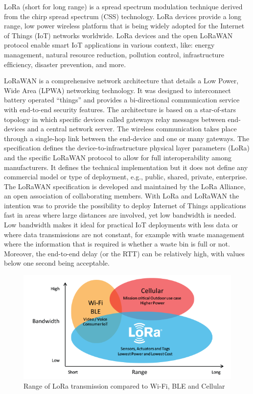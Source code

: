 			LoRa (short for long range) is a spread spectrum modulation
			technique derived from the chirp spread spectrum (CSS)
			technology. LoRa devices provide a long range, low power
			wireless platform that is being widely adopted for the Internet
			of Things (IoT) networks worldwide. LoRa devices and the
			open LoRaWAN protocol enable smart IoT applications in
			various context, like: energy management, natural resource
			reduction, pollution control, infrastructure efﬁciency, disaster
			prevention, and more.

			LoRaWAN is a comprehensive network architecture that details a Low Power, Wide Area (LPWA) networking technology.
			It was designed to interconnect battery operated “things” and
			provides a bi-directional communication service with end-to-end security features. The architecture is based on a star-of-stars topology in which speciﬁc devices called gateways relay
			messages between end-devices and a central network server.
			The wireless communication takes place through a single-hop
			link between the end-device and one or many gateways.
			The speciﬁcation deﬁnes the device-to-infrastructure physical layer parameters (LoRa) and the speciﬁc LoRaWAN protocol to allow for full interoperability among manufacturers. It
			deﬁnes the technical implementation but it does not deﬁne any
			commercial model or type of deployment, e.g., public, shared,
			private, enterprise. The LoRaWAN speciﬁcation is developed
			and maintained by the LoRa Alliance, an open association
			of collaborating members. With LoRa and LoRaWAN the
			intention was to provide the possibility to deploy Internet of
			Things applications fast in areas where large distances are
			involved, yet low bandwidth is needed. Low bandwidth makes
			it ideal for practical IoT deployments with less data or where
			data transmissions are not constant, for example with waste
			management where the information that is required is whether
			a waste bin is full or not. Moreover, the end-to-end delay (or
			the RTT) can be relatively high, with values below one second
			being acceptable.
			
			\begin{figure}
				\centering
				\includegraphics[width=\textwidth]{resources/img/chap3/LoRa_Why_Range}
				\caption{Range of LoRa transmission compared to Wi-Fi, BLE and Cellular}
			\end{figure}
			

